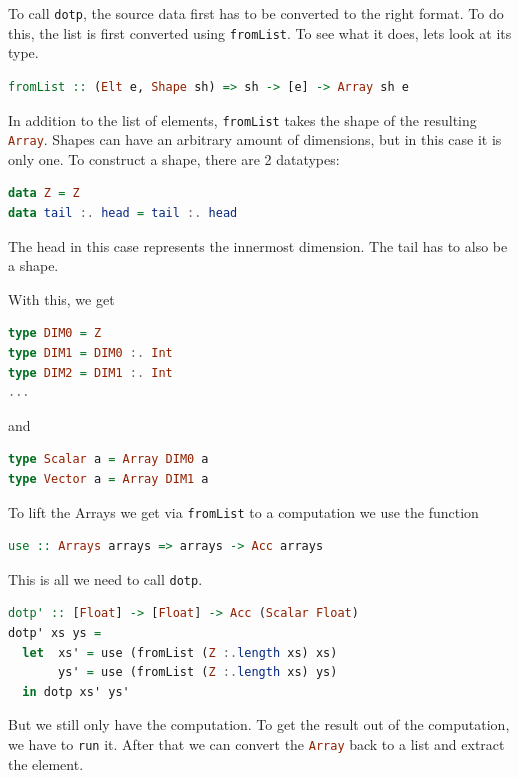 \documentclass[a4paper,bibliography=totocnumbered,parskip,headsepline]{scrbook}
\begin{document}
To call \lstinline[language=haskell]!dotp!, the source data first has to be converted to the right format.
To do this, the list is first converted using \lstinline[language=haskell]!fromList!.
To see what it does, lets look at its type.

\begin{lstlisting}[language=haskell]
fromList :: (Elt e, Shape sh) => sh -> [e] -> Array sh e
\end{lstlisting}

In addition to the list of elements, \lstinline[language=haskell]!fromList! takes the shape of the resulting \lstinline[language=haskell]!Array!.
Shapes can have an arbitrary amount of dimensions, but in this case it is only one.
To construct a shape, there are 2 datatypes:

\begin{lstlisting}[language=haskell]
data Z = Z
data tail :. head = tail :. head
\end{lstlisting}

The head in this case represents the innermost dimension.
The tail has to also be a shape.

With this, we get
\begin{lstlisting}[language=haskell]
type DIM0 = Z
type DIM1 = DIM0 :. Int
type DIM2 = DIM1 :. Int
...
\end{lstlisting}
\newpage
and
\begin{lstlisting}[language=haskell]
type Scalar a = Array DIM0 a
type Vector a = Array DIM1 a
\end{lstlisting}

To lift the Arrays we get via \lstinline[language=haskell]!fromList! to a computation we use the function
\begin{lstlisting}[language=haskell]
use :: Arrays arrays => arrays -> Acc arrays
\end{lstlisting}

This is all we need to call \lstinline[language=haskell]!dotp!.

\begin{lstlisting}[language=haskell]
dotp' :: [Float] -> [Float] -> Acc (Scalar Float)
dotp' xs ys =
  let  xs' = use (fromList (Z :.length xs) xs)
       ys' = use (fromList (Z :.length xs) ys)
  in dotp xs' ys'
\end{lstlisting}

But we still only have the computation.
To get the result out of the computation, we have to \lstinline[language=haskell]!run! it.
After that we can convert the \lstinline[language=haskell]!Array! back to a list and extract the element.
\end{document}
